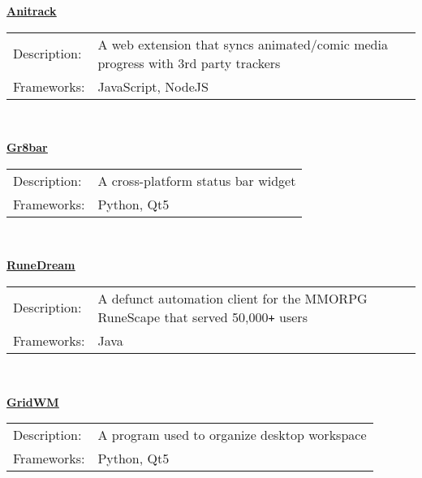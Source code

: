 \documentclass[a4paper]{article}
\begin{document}
{\textbf{\href{https://github.com/TSedlar/anitrack}{\ul{Anitrack}}}}\\
\vspace*{1mm}
\begin{tabular}{ l l }
    Description: & A web extension that syncs animated/comic media progress with 3rd party trackers\\
    Frameworks:  & JavaScript, NodeJS
\end{tabular}\\
\vspace*{2mm}

{\textbf{\href{https://github.com/TSedlar/gr8bar}{\ul{Gr8bar}}}}\\
\vspace*{1mm}
\begin{tabular}{ l l }
    Description: & A cross-platform status bar widget\\
    Frameworks:  & Python, Qt5
\end{tabular}\\
\vspace*{2mm}

{\textbf{\href{https://github.com/FThompson/RuneDream-API}{\ul{RuneDream}}}}\\
\vspace*{1mm}
\begin{tabular}{ l l }
    Description: & A defunct automation client for the MMORPG RuneScape that served 50,000\texttt{+} users\\
    Frameworks:  & Java
\end{tabular}\\
\vspace*{2mm}

{\textbf{\href{https://github.com/TSedlar/GridWM}{\ul{GridWM}}}}\\
\vspace*{1mm}
\begin{tabular}{ l l }
    Description: & A program used to organize desktop workspace\\
    Frameworks:  & Python, Qt5
\end{tabular}\\
\vspace*{2mm}
\end{document}
